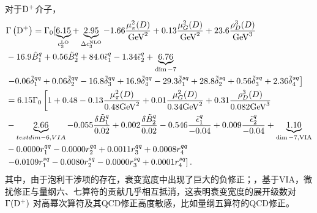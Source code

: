     对于$\mathrm{D^{+}}$介子，
    \begin{equation}
        \begin{aligned}
        & \Gamma\left(\mathrm{D^{+}}\right)= \Gamma_0[\underbrace{6.15}_{c_3^{\mathrm{LO}}}+\underbrace{2.95}_{\Delta c_3^{\mathrm{NLO}}}-1.66 \frac{\mu_\pi^2(D)}{\mathrm{GeV}^2}+0.13 \frac{\mu_G^2(D)}{\mathrm{GeV}^2}+23.6 \frac{\rho_D^3(D)}{\mathrm{GeV}^3} \\
        &-16.9 \tilde{B}_1^q+0.56 \tilde{B}_2^q+84.0 \tilde{\epsilon}_1^q-1.34 \tilde{\epsilon}_2^q+\underbrace{6.76}_{\operatorname{dim}-7} \\
        &\left.-0.06 \tilde{\delta}_1^{q q}+0.06 \tilde{\delta}_2^{q q}-16.8 \tilde{\delta}_3^{q q}+16.9 \tilde{\delta}_4^{q q}-29.3 \tilde{\delta}_1^{s q}+28.8 \tilde{\delta}_2^{s q}+0.56 \tilde{\delta}_3^{s q}+2.36 \tilde{\delta}_4^{s q}\right] \\
        &= 6.15 \Gamma_0\left[1+0.48-0.13 \frac{\mu_\pi^2(D)}{0.48 \mathrm{GeV}^2}+0.01 \frac{\mu_G^2(D)}{0.34 \mathrm{GeV}^2}+0.31 \frac{\rho_D^3(D)}{0.082 \mathrm{GeV}^3}\right. \\
        &-\underbrace{2.66}_{text {dim-6,VIA }}-0.055 \frac{\delta \tilde{B}_1^q}{0.02}+0.002 \frac{\delta \tilde{B}_2^q}{0.02}-0.546 \frac{\tilde{\epsilon}_1^q}{-0.04}+0.009 \frac{\tilde{\epsilon}_2^q}{-0.04}+\underbrace{1.10}_{\operatorname{dim}-7, \mathrm{VIA}} \\
        &-0.0000 r_1^{q q}-0.0000 r_2^{q q}+0.0011 r_3^{q q}+0.0008 r_4^{q q} \\
        &\left.-0.0109 r_1^{s q}-0.0080 r_2^{s q}-0.0000 r_3^{s q}+0.0001 r_4^{s q}\right].
        \end{aligned}
        \label{eq:decaywidth_Dp_kinetic}
        \end{equation}
        其中，由于泡利干涉项的存在，衰变宽度中出现了巨大的负修正；，基于VIA，微扰修正与量纲六、七算符的贡献几乎相互抵消，这表明衰变宽度的展开级数对 $\mathrm{\Gamma(D^{+})}$ 对高幂次算符及其QCD修正高度敏感，比如量纲五算符的QCD修正。
